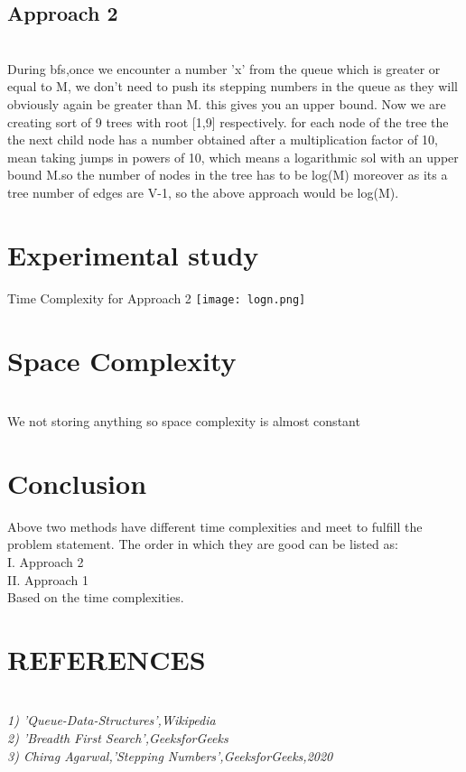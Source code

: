 \documentclass[conference]{IEEEtran}
\begin{document}
\subsection{\textbf{Approach 2}} 
\\ During bfs,once we encounter a number 'x' from the queue which is greater or equal to M, we don't need to push its stepping numbers in the queue as they will obviously again be greater than M. this gives you an upper bound. Now we are creating sort of 9 trees with root [1,9] respectively. 
for each node of the tree the the next child node has a number obtained after a multiplication factor of 10, mean taking jumps in powers of 10, which means a logarithmic sol with an upper bound M.so the number of nodes in the tree has to be log(M) moreover as its a tree number of edges are V-1, so the above approach would be log(M).

\section{Experimental study}
\begin{flushleft}
\end{flushleft}
\newpage
Time Complexity for Approach 2
\texttt{[image: logn.png]}

\section{Space Complexity}\\
We not storing anything so space complexity is almost constant


\section{Conclusion}
Above two methods have different time complexities and meet to fulfill the problem statement. The order in which they are good can be listed as:
\\I. Approach 2
\\II. Approach 1
\\Based on the time complexities.
\section{REFERENCES}\\
\textit{1) 'Queue-Data-Structures',Wikipedia}\\
\textit{2) 'Breadth First Search',GeeksforGeeks}\\
\textit{3) Chirag Agarwal,'Stepping Numbers',GeeksforGeeks,2020}
\end{document}
